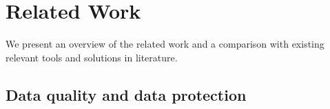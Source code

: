 \section{Related Work}\label{sec:related}

{\color{OurColor}
We present an overview of the related work and a comparison with existing relevant tools and solutions in literature.

}
\subsection{Data quality and data protection}\label{sec:dataquality}

